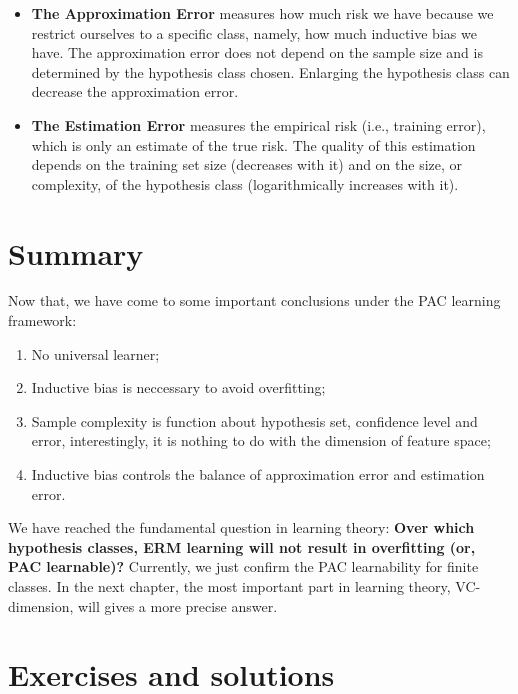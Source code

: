 \documentclass{article}
\begin{document}
	\begin{itemize}
	\item \textbf{The Approximation Error} measures how much risk we have because we restrict ourselves to a specific class, namely, how much inductive bias we have. The approximation error does not depend on the sample size and is determined by the hypothesis class chosen. Enlarging the hypothesis class can decrease the approximation error.
	\item \textbf{The Estimation Error} measures the empirical risk (i.e., training error), which is only an estimate of the true risk. The quality of this estimation depends on the training set size (decreases with it) and on the size, or complexity, of the hypothesis class (logarithmically increases with it).
	\end{itemize}

\section{Summary}

Now that, we have come to some important conclusions under the PAC learning framework:

\begin{enumerate}
\item No universal learner;
\item Inductive bias is neccessary to avoid overfitting;
\item Sample complexity is function about hypothesis set, confidence level and error, interestingly, it is nothing to do with the dimension of feature space;
\item Inductive bias controls the balance of approximation error and estimation error.
\end{enumerate}

	We have reached the fundamental question in learning theory: \textbf{Over which hypothesis classes, ERM learning will not result in overfitting (or, PAC learnable)?} Currently, we just confirm the PAC learnability for finite classes. In the next chapter, the most important part in learning theory, VC-dimension, will gives a more precise answer.


\section{Exercises and solutions}
\end{document}

